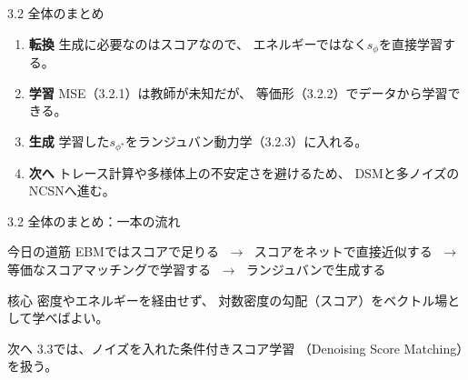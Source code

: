 \asmain
\begin{frame}{3.2 全体のまとめ}
    \begin{enumerate}
        \item \textbf{転換}
        生成に必要なのはスコアなので、
        エネルギーではなく$s_\phi$を直接学習する。
        \item \textbf{学習}
        MSE（3.2.1）は教師が未知だが、
        等価形（3.2.2）でデータから学習できる。
        \item \textbf{生成}
        学習した$s_{\phi^\star}$をランジュバン動力学（3.2.3）に入れる。
        \item \textbf{次へ}
        トレース計算や多様体上の不安定さを避けるため、
        DSMと多ノイズのNCSNへ進む。
    \end{enumerate}
\end{frame}
\asmain
\begin{frame}{3.2 全体のまとめ：一本の流れ}
    \begin{block}{今日の道筋}
        EBMではスコアで足りる
        $\;\to\;$
        スコアをネットで直接近似する
        $\;\to\;$
        等価なスコアマッチングで学習する
        $\;\to\;$
        ランジュバンで生成する
    \end{block}
    \begin{block}{核心}
        密度やエネルギーを経由せず、
        対数密度の勾配（スコア）をベクトル場として学べばよい。
    \end{block}
    \begin{block}{次へ}
        3.3では、ノイズを入れた条件付きスコア学習
        （Denoising Score Matching）を扱う。
    \end{block}
\end{frame}
